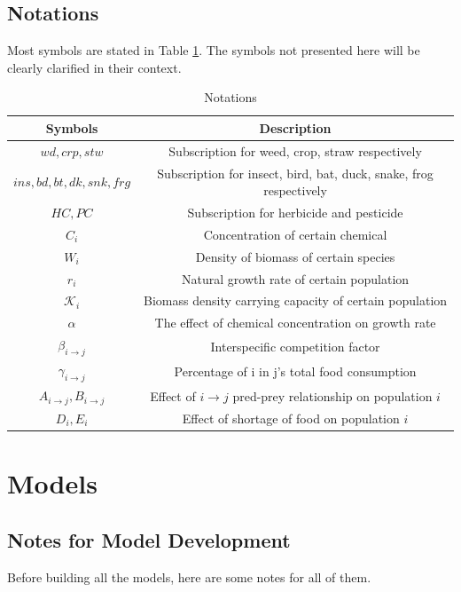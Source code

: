 \documentclass{HZNUMCM}
\begin{document}
        \subsection{Notations}
          Most symbols are stated in Table \ref{tab:Notations}. The symbols not presented here will be clearly clarified in their context.
      \begin{table}[H]
        \centering
        \caption{Notations}
        \begin{tabular}{cc}
          \toprule
          \rowcolor{customcolor!40} %
          Symbols & Description\\
          \midrule
          $wd, crp , stw$ & Subscription for weed, crop, straw respectively \\
          $ins, bd, bt, dk, snk, frg$ & Subscription for insect, bird, bat, duck, snake, frog respectively\\
          $HC, PC$ & Subscription for herbicide and pesticide \\
          $C_i$ & Concentration of certain chemical \\
          $W_i$ & Density of biomass of certain species \\
          $r_i$ & Natural growth rate of certain population\\
          $\mathscr{K}_i$ & Biomass density carrying capacity of certain population\\
          $\alpha$ & The effect of chemical concentration on growth rate\\
          $\beta_{i \rightarrow j}$ & Interspecific competition factor\\
          $\gamma_{i \rightarrow j}$ & Percentage of i in j's total food consumption\\
          $A_{i\rightarrow j},B_{i\rightarrow j}$ & Effect of $i\rightarrow j$ pred-prey relationship on population $i$ \\
          $D_i,E_i$ & Effect of shortage of food on population $i$ \\
          \bottomrule
        \end{tabular}
        \label{tab:Notations}
      \end{table}
  \section{Models}
    \subsection{Notes for Model Development}
        Before building all the models, here are some notes for all of them.
        
\end{document}

